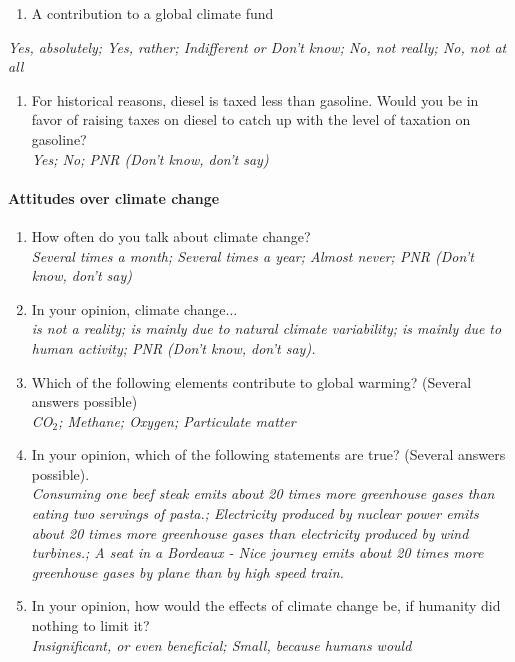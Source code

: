 \documentclass[english,5p,authoryear]{elsarticle}
\begin{document}
\begin{appendices}
\begin{enumerate}[resume,leftmargin=*]
\begin{enumerate}[resume,leftmargin=*]
\item A contribution to a global climate fund 
\end{enumerate}
\end{enumerate}
\textit{Yes, absolutely; Yes, rather; Indifferent or Don't know; No,
not really; No, not at all}
\begin{enumerate}[resume,leftmargin=*]
\item For historical reasons, diesel is taxed less than gasoline. Would
you be in favor of raising taxes on diesel to catch up with the level
of taxation on gasoline? \textit{}\\
\textit{Yes; No; PNR (Don't know, don't say) }
\end{enumerate}

\paragraph{Attitudes over climate change}
\begin{enumerate}[resume,leftmargin=*]
\item How often do you talk about climate change? \textit{}\\
\textit{Several times a month; Several times a year; Almost never; PNR
(Don't know, don't say) }
\item In your opinion, climate change... \textit{}\\
\textit{is not a reality; is mainly due to natural climate variability;
is mainly due to human activity; PNR (Don't know, don't say). }
\item Which of the following elements contribute to global warming? (Several
answers possible) \textit{}\\
\textit{CO$_{2}$; Methane; Oxygen; Particulate matter}
\item In your opinion, which of the following statements are true? (Several
answers possible). \textit{}\\
\textit{Consuming one beef steak emits about 20 times more greenhouse
gases than eating two servings of pasta.; Electricity produced by
nuclear power emits about 20 times more greenhouse gases than electricity
produced by wind turbines.; A seat in a Bordeaux - Nice journey emits
about 20 times more greenhouse gases by plane than by high speed train. }
\item In your opinion, how would the effects of climate change be, if humanity
did nothing to limit it? \textit{}\\
\textit{Insignificant, or even beneficial; Small, because humans would
}
\end{enumerate}
\end{appendices}
\end{document}
